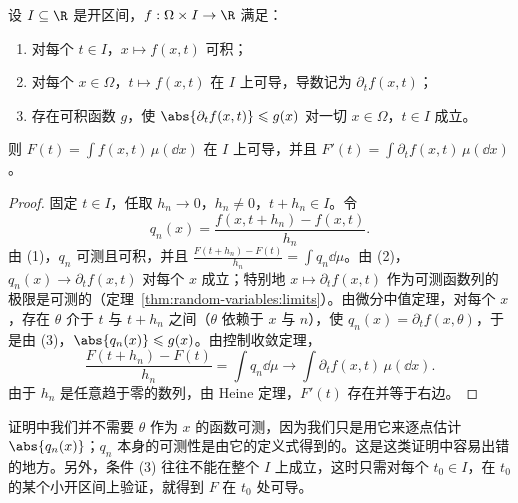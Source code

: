 \begin{theorem}[积分号下求导]\label{thm:integration:differentiation}
设 $I\subseteq\R$ 是开区间，$f:\Omega\times I\to\R$ 满足：
\begin{enumerate}
\item 对每个 $t\in I$，$x\mapsto f(x,t)$ 可积；
\item 对每个 $x\in\Omega$，$t\mapsto f(x,t)$ 在 $I$ 上可导，导数记为 $\partial_tf(x,t)$；
\item 存在可积函数 $g$，使 $\abs{\partial_tf(x,t)}\leqslant g(x)$ 对一切 $x\in\Omega$，$t\in I$ 成立。
\end{enumerate}
则 $F(t)=\int f(x,t)\,\mu(\dd x)$ 在 $I$ 上可导，并且 $F'(t)=\int\partial_tf(x,t)\,\mu(\dd x)$。
\end{theorem}
\begin{proof}
固定 $t\in I$，任取 $h_n\to0$，$h_n\neq0$，$t+h_n\in I$。令
\[
q_n(x)=\frac{f(x,t+h_n)-f(x,t)}{h_n}.
\]
由 (1)，$q_n$ 可测且可积，并且 $\frac{F(t+h_n)-F(t)}{h_n}=\int q_n\dd\mu$。由 (2)，$q_n(x)\to\partial_tf(x,t)$ 对每个 $x$ 成立；特别地 $x\mapsto\partial_tf(x,t)$ 作为可测函数列的极限是可测的（定理~\ref{thm:random-variables:limits}）。由微分中值定理，对每个 $x$，存在 $\theta$ 介于 $t$ 与 $t+h_n$ 之间（$\theta$ 依赖于 $x$ 与 $n$），使 $q_n(x)=\partial_tf(x,\theta)$，于是由 (3)，$\abs{q_n(x)}\leqslant g(x)$。由控制收敛定理，
\[
\frac{F(t+h_n)-F(t)}{h_n}=\int q_n\dd\mu\to\int\partial_tf(x,t)\,\mu(\dd x).
\]
由于 $h_n$ 是任意趋于零的数列，由 Heine 定理，$F'(t)$ 存在并等于右边。
\end{proof}

\begin{remark}
证明中我们并不需要 $\theta$ 作为 $x$ 的函数可测，因为我们只是用它来逐点估计 $\abs{q_n(x)}$；$q_n$ 本身的可测性是由它的定义式得到的。这是这类证明中容易出错的地方。另外，条件 (3) 往往不能在整个 $I$ 上成立，这时只需对每个 $t_0\in I$，在 $t_0$ 的某个小开区间上验证，就得到 $F$ 在 $t_0$ 处可导。
\end{remark}

